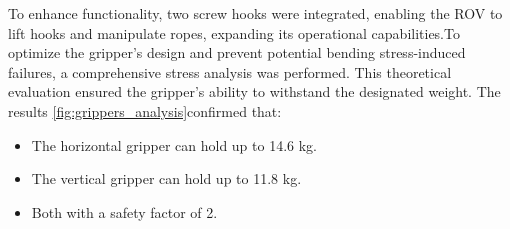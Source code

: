 To enhance functionality, two screw hooks were integrated, enabling the ROV to lift hooks and manipulate ropes, expanding its operational capabilities.To optimize the gripper’s design and prevent potential bending stress-induced failures, a comprehensive stress analysis was performed. This theoretical evaluation ensured the gripper’s ability to withstand the designated weight. The results \ref{fig:grippers_analysis}confirmed that:

\vspace{-0.5\baselineskip}
\begin{itemize}
    \setlength{\itemsep}{0pt}
    \item The horizontal gripper can hold up to 14.6 kg.
    \item The vertical gripper can hold up to 11.8 kg.
    \item Both with a safety factor of 2.
\end{itemize}

